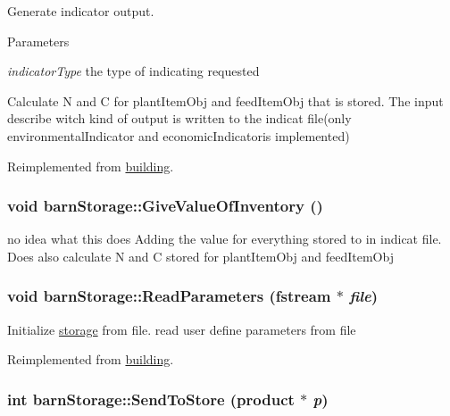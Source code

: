 Generate indicator output. 
\begin{DoxyParams}{Parameters}
\item[{\em indicatorType}]the type of indicating requested\end{DoxyParams}
Calculate N and C for plantItemObj and feedItemObj that is stored. The input describe witch kind of output is written to the indicat file(only environmentalIndicator and economicIndicatoris implemented) 

Reimplemented from \hyperlink{classbuilding_ae0e21d6fc26978c65a980676ddf4fcdf}{building}.\hypertarget{classbarn_storage_a26ffc2da0bfc8f9efd9e0c75e42d22e2}{
\subsubsection[{GiveValueOfInventory}]{\setlength{\rightskip}{0pt plus 5cm}void barnStorage::GiveValueOfInventory ()}}
\label{classbarn_storage_a26ffc2da0bfc8f9efd9e0c75e42d22e2}


no idea what this does Adding the value for everything stored to in indicat file. Does also calculate N and C stored for plantItemObj and feedItemObj \hypertarget{classbarn_storage_a04a2ab71aceafb10d6f4a51ed59960e5}{
\subsubsection[{ReadParameters}]{\setlength{\rightskip}{0pt plus 5cm}void barnStorage::ReadParameters (fstream $\ast$ {\em file})}}
\label{classbarn_storage_a04a2ab71aceafb10d6f4a51ed59960e5}


Initialize \hyperlink{classstorage}{storage} from file. read user define parameters from file 

Reimplemented from \hyperlink{classbuilding_a5649b5598b63c3a4cf7a4e6e7d452d5d}{building}.\hypertarget{classbarn_storage_af10d75ac33adcdd0f6ebe63d25b9d2b3}{
\subsubsection[{SendToStore}]{\setlength{\rightskip}{0pt plus 5cm}int barnStorage::SendToStore ({\bf product} $\ast$ {\em p})}}
\label{classbarn_storage_af10d75ac33adcdd0f6ebe63d25b9d2b3}


